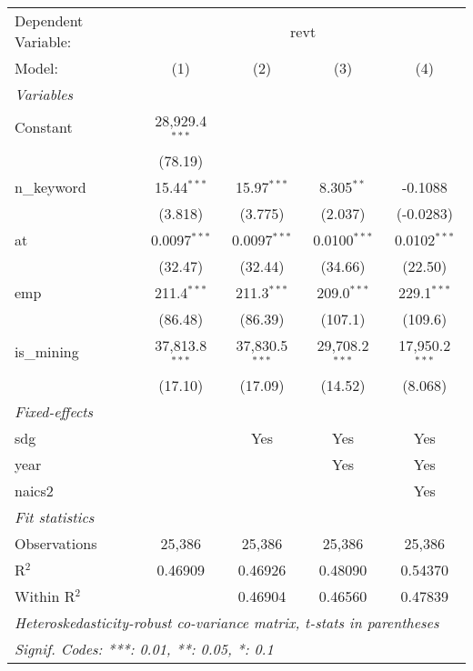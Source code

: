 
\begingroup
\centering
\begin{tabular}{lcccc}
   \tabularnewline \midrule \midrule
   Dependent Variable: & \multicolumn{4}{c}{revt}\\
   Model:       & (1)              & (2)              & (3)              & (4)\\  
   \midrule
   \emph{Variables}\\
   Constant     & 28,929.4$^{***}$ &                  &                  &   \\   
                & (78.19)          &                  &                  &   \\   
   n\_keyword   & 15.44$^{***}$    & 15.97$^{***}$    & 8.305$^{**}$     & -0.1088\\   
                & (3.818)          & (3.775)          & (2.037)          & (-0.0283)\\   
   at           & 0.0097$^{***}$   & 0.0097$^{***}$   & 0.0100$^{***}$   & 0.0102$^{***}$\\   
                & (32.47)          & (32.44)          & (34.66)          & (22.50)\\   
   emp          & 211.4$^{***}$    & 211.3$^{***}$    & 209.0$^{***}$    & 229.1$^{***}$\\   
                & (86.48)          & (86.39)          & (107.1)          & (109.6)\\   
   is\_mining   & 37,813.8$^{***}$ & 37,830.5$^{***}$ & 29,708.2$^{***}$ & 17,950.2$^{***}$\\   
                & (17.10)          & (17.09)          & (14.52)          & (8.068)\\   
   \midrule
   \emph{Fixed-effects}\\
   sdg          &                  & Yes              & Yes              & Yes\\  
   year         &                  &                  & Yes              & Yes\\  
   naics2       &                  &                  &                  & Yes\\  
   \midrule
   \emph{Fit statistics}\\
   Observations & 25,386           & 25,386           & 25,386           & 25,386\\  
   R$^2$        & 0.46909          & 0.46926          & 0.48090          & 0.54370\\  
   Within R$^2$ &                  & 0.46904          & 0.46560          & 0.47839\\  
   \midrule \midrule
   \multicolumn{5}{l}{\emph{Heteroskedasticity-robust co-variance matrix, t-stats in parentheses}}\\
   \multicolumn{5}{l}{\emph{Signif. Codes: ***: 0.01, **: 0.05, *: 0.1}}\\
\end{tabular}
\par\endgroup


